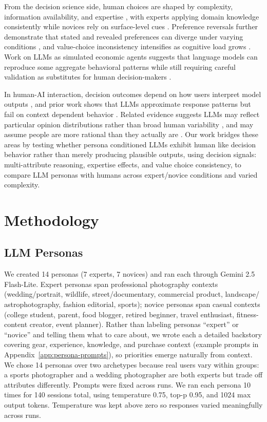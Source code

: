 \documentclass[manuscript,review]{acmart}
\begin{document}
From the decision science side, human choices are shaped by complexity, information availability, and expertise \cite{payne1993adaptive}, with experts applying domain knowledge consistently while novices rely on surface-level cues \cite{chi1988nature, shanteau1992competence}. Preference reversals further demonstrate that stated and revealed preferences can diverge under varying conditions \cite{slovic1983preference}, and value-choice inconsistency intensifies as cognitive load grows \cite{Tversky, sweller1988cognitive}. Work on LLMs as simulated economic agents suggests that language models can reproduce some aggregate behavioral patterns while still requiring careful validation as substitutes for human decision-makers \cite{horton2023large}.

In human-AI interaction, decision outcomes depend on how users interpret model outputs \cite{bansal2021does}, and prior work shows that LLMs approximate response patterns but fail on context dependent behavior \cite{argyle2023out}. Related evidence suggests LLMs may reflect particular opinion distributions rather than broad human variability \cite{santurkar}, and may assume people are more rational than they actually are \cite{liu2024rational}. Our work bridges these areas by testing whether persona conditioned LLMs exhibit human like decision behavior rather than merely producing plausible outputs, using decision signals: multi-attribute reasoning, expertise effects, and value choice consistency, to compare LLM personas with humans across expert/novice conditions and varied complexity.

\section{Methodology}

\subsection{LLM Personas}
We created 14 personas (7 experts, 7 novices) and ran each through Gemini 2.5 Flash-Lite. Expert personas span professional photography contexts (wedding/portrait, wildlife, street/documentary, commercial product, landscape/ astrophotography, fashion editorial, sports); novice personas span casual contexts (college student, parent, food blogger, retired beginner, travel enthusiast, fitness-content creator, event planner). Rather than labeling personas ``expert'' or ``novice'' and telling them what to care about, we wrote each a detailed backstory covering gear, experience, knowledge, and purchase context (example prompts in Appendix~\ref{app:persona-prompts}), so priorities emerge naturally from context. We chose 14 personas over two archetypes because real users vary within groups: a sports photographer and a wedding photographer are both experts but trade off attributes differently. Prompts were fixed across runs. We ran each persona 10 times for 140 sessions total, using temperature 0.75, top-p 0.95, and 1024 max output tokens. Temperature was kept above zero so responses varied meaningfully across runs.
\end{document}
